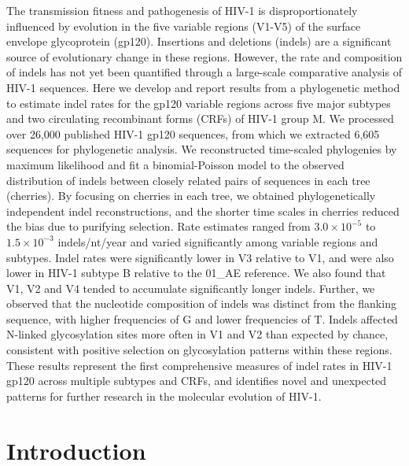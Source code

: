 \documentclass[12pt]{article}
\begin{document}
The transmission fitness and pathogenesis of HIV-1 is disproportionately influenced by evolution in the five variable regions (V1-V5) of the surface envelope glycoprotein (gp120).
Insertions and deletions (indels) are a significant source of evolutionary change in these regions.
However, the rate and composition of indels has not yet been quantified through a large-scale comparative analysis of HIV-1 sequences.
Here we develop and report results from a phylogenetic method to estimate indel rates for the gp120 variable regions across five major subtypes and two circulating recombinant forms (CRFs) of HIV-1 group M.
We processed over 26,000 published HIV-1 gp120 sequences, from which we extracted 6,605 sequences for phylogenetic analysis.
We reconstructed time-scaled phylogenies by maximum likelihood and fit a binomial-Poisson model to the observed distribution of indels between closely related pairs of sequences in each tree (cherries).
By focusing on cherries in each tree, we obtained phylogenetically independent indel reconstructions, and the shorter time scales in cherries reduced the bias due to purifying selection.
Rate estimates ranged from $3.0\times 10^{-5}$ to $1.5 \times 10^{-3}$ indels/nt/year and varied significantly among variable regions and subtypes.
Indel rates were significantly lower in V3 relative to V1, and were also lower in HIV-1 subtype B relative to the 01\_AE reference.
We also found that V1, V2 and V4 tended to accumulate significantly longer indels.
Further, we observed that the nucleotide composition of indels was distinct from the flanking sequence, with higher frequencies of G and lower frequencies of T.
Indels affected N-linked glycosylation sites more often in V1 and V2 than expected by chance, consistent with positive selection on glycosylation patterns within these regions.
These results represent the first comprehensive measures of indel rates in HIV-1 gp120 across multiple subtypes and CRFs, and identifies novel and unexpected patterns for further research in the molecular evolution of HIV-1.




\clearpage

\section * {Introduction}
\end{document}
